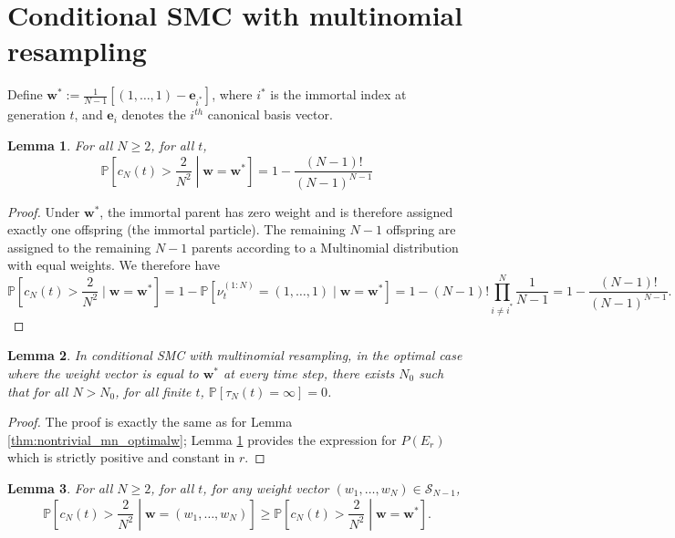 \documentclass{article}
\newtheorem{lemma}{Lemma}
\newcommand{\PR}{\mathbb{P}}
\begin{document}
\section*{Conditional SMC with multinomial resampling}

Define $\mathbf{w}^* := \frac{1}{N-1} \left[ (1,\dots,1) - \mathbf{e}_{i^*} \right]$, where $i^*$ is the immortal index at generation $t$, and $\mathbf{e}_i$ denotes the $i^{th}$ canonical basis vector.
 
\begin{lemma}\label{lem:csmc_cN_LB}
For all $N\geq 2$, for all $t$,
\begin{equation*}
\PR \left[c_N(t) > \frac{2}{N^2} \middle| \mathbf{w}=\mathbf{w}^*  \right] 
= 1- \frac{(N-1)!}{(N-1)^{N-1}}
\end{equation*}
\end{lemma}

\begin{proof}
Under $\mathbf{w}^*$, the immortal parent has zero weight and is therefore assigned exactly one offspring (the immortal particle). The remaining $N-1$ offspring are assigned to the remaining $N-1$ parents according to a Multinomial distribution with equal weights. We therefore have
\begin{equation*}
\PR \left[c_N(t) > \frac{2}{N^2} \mid \mathbf{w}=\mathbf{w}^* \right]
= 1-\PR[\nu_t^{(1:N)} = (1,\dots, 1) \mid \mathbf{w}=\mathbf{w}^*] 
= 1- (N-1)! \prod_{i\neq i^*}^{N} \frac{1}{N-1}
= 1- \frac{(N-1)!}{(N-1)^{N-1}} .
\end{equation*}
\end{proof} 

 
\begin{lemma}\label{thm:nontrivial_csmc_optimalw}
In conditional SMC with multinomial resampling, in the optimal case where the weight vector is equal to $\mathbf{w}^*$ at every time step, there exists $N_0$ such that for all $N>N_0$, for all finite $t$, $\PR[\tau_N(t) = \infty] =0$.
\end{lemma}

\begin{proof}
The proof is exactly the same as for Lemma \ref{thm:nontrivial_mn_optimalw}; Lemma \ref{lem:csmc_cN_LB} provides the expression for $P(E_r)$ which is strictly positive and constant in $r$.
\end{proof}


\begin{lemma}\label{lem:csmc_optimal_w}
For all $N\geq 2$, for all $t$, for any weight vector $(w_1, \dots, w_N) \in \mathcal{S}_{N-1}$,
\begin{equation*}
\PR \left[c_N(t) > \frac{2}{N^2} \middle| \mathbf{w}=(w_1, \dots, w_N) \right]
\geq \PR \left[c_N(t) > \frac{2}{N^2} \middle| \mathbf{w}=\mathbf{w}^* \right].
\end{equation*}
\end{lemma}
\end{document}
